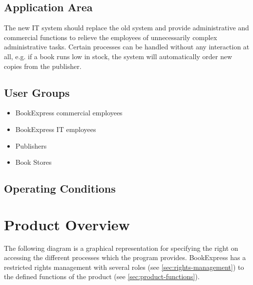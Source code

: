 \documentclass[11pt,a4paper,oneside,svgnames]{report}
\begin{document}
\section{Application Area}
The new IT system should replace the old system and provide administrative and commercial functions to relieve the employees of unnecessarily complex administrative tasks. Certain processes can be handled without any interaction at all, e.g. if a book runs low in stock, the system will automatically order new copies from the publisher.
\section{User Groups}
\begin{itemize}
\item BookExpress commercial employees
\item BookExpress IT employees
\item Publishers
\item Book Stores
\end{itemize}
\section{Operating Conditions}

\chapter{Product Overview}
The following diagram is a graphical representation for specifying the right on accessing   the different processes which the program provides.
BookExpress has a restricted rights management with several roles (see \ref{sec:rights-management}) to the defined functions of the product (see \ref{sec:product-functions}).
\end{document}
